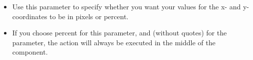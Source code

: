 \begin{itemize}
\item Use this parameter to specify whether you want your values for the x- and y-coordinates to be in pixels or percent.
\item  If you choose percent for  this parameter, and  (without quotes) for the  parameter, the action will always be executed in the middle of the component.
\end{itemize}
